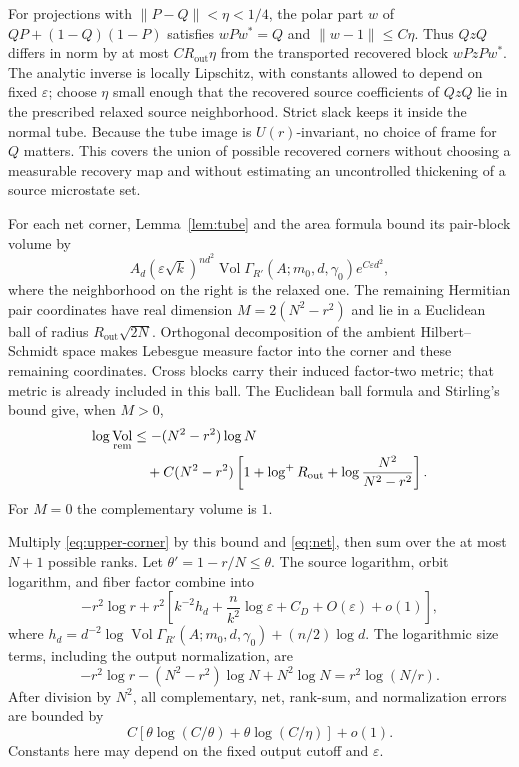 \documentclass[11pt]{article}
\theoremstyle{definition}\newtheorem{definition}[theorem]{Definition}
\theoremstyle{remark}\newtheorem{remark}[theorem]{Remark}
\DeclareMathOperator{\Vol}{Vol}\DeclareMathOperator{\rank}{rank}
\newcommand{\eps}{\varepsilon}\newcommand{\id}{\mathrm{id}}
\begin{document}
For projections with $\|P-Q\|<\eta<1/4$, the polar part $w$ of
$QP+(1-Q)(1-P)$ satisfies $wPw^*=Q$ and $\|w-1\|\leq C\eta$.
Thus $QzQ$ differs in norm by at most $CR_{\mathrm{out}}\eta$ from
the transported recovered block $wPzPw^*$. The analytic inverse is
locally Lipschitz, with constants allowed to depend on fixed $\eps$;
choose $\eta$ small enough that the recovered source coefficients of
$QzQ$ lie in the prescribed relaxed source neighborhood. Strict slack
keeps it inside the normal tube. Because the tube image is
$U(r)$-invariant, no choice of frame for $Q$ matters. This covers the
union of possible recovered corners without choosing a measurable
recovery map and without estimating an uncontrolled thickening of a
source microstate set.

For each net corner, Lemma~\ref{lem:tube} and the area formula bound
its pair-block volume by
\begin{equation}\label{eq:upper-corner}
 A_d(\eps\sqrt k)^{nd^2}\Vol\Gamma_{R'}(A;m_0,d,\gamma_0)
 e^{C\eps d^2},
\end{equation}
where the neighborhood on the right is the relaxed one.
The remaining Hermitian pair coordinates have real dimension
$M=2(N^2-r^2)$ and lie in a Euclidean ball of radius
$R_{\mathrm{out}}\sqrt{2N}$. Orthogonal decomposition of the ambient
Hilbert--Schmidt space makes Lebesgue measure factor into the corner
and these remaining coordinates. Cross blocks carry their induced
factor-two metric; that metric is already included in this ball.
The Euclidean ball formula and Stirling's bound give, when $M>0$,
\begin{align}
 \log\Vol_{\rm rem}
 &\leq-(N^2-r^2)\log N\notag\\
 &\quad+C(N^2-r^2)
 \left[1+\log^+R_{\mathrm{out}}+
                  \log\frac{N^2}{N^2-r^2}\right].
 \label{eq:remainder-ball}
\end{align}
For $M=0$ the complementary volume is $1$.

Multiply \eqref{eq:upper-corner} by this bound and \eqref{eq:net},
then sum over the at most $N+1$ possible ranks. Let
$\theta'=1-r/N\leq\theta$. The source logarithm, orbit logarithm,
and fiber factor combine into
\[
 -r^2\log r+r^2
 \left[k^{-2}h_d+\frac n{k^2}\log\eps+C_D+O(\eps)+o(1)\right],
\]
where
$h_d=d^{-2}\log\Vol\Gamma_{R'}(A;m_0,d,\gamma_0)+(n/2)\log d$.
The logarithmic size terms, including the output normalization, are
\[
 -r^2\log r-(N^2-r^2)\log N+N^2\log N
 =r^2\log(N/r).
\]
After division by $N^2$, all complementary, net, rank-sum, and
normalization errors are bounded by
\begin{equation}\label{eq:theta-error}
 C\left[\theta\log(C/\theta)+\theta\log(C/\eta)\right]+o(1).
\end{equation}
Constants here may depend on the fixed output cutoff and $\eps$.
\end{document}

